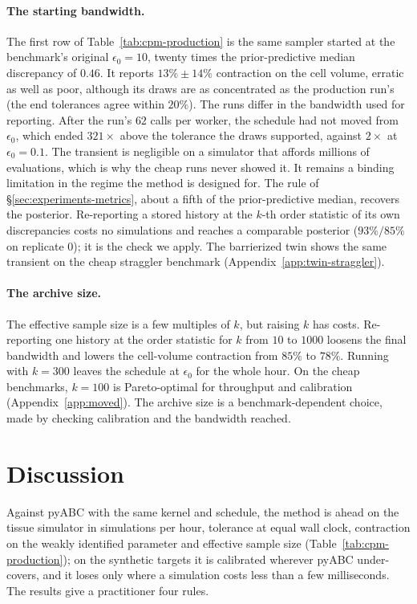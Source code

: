 \documentclass[10pt]{article}
\theoremstyle{plain}
\theoremstyle{definition}
\begin{document}
\paragraph{The starting bandwidth.} The first row of Table~\ref{tab:cpm-production} is the same sampler started at the benchmark's original $\epsilon_0=10$, twenty times the prior-predictive median discrepancy of $0.46$. It reports $13\%\pm14\%$ contraction on the cell volume, erratic as well as poor, although its draws are as concentrated as the production run's (the end tolerances agree within $20\%$). The runs differ in the bandwidth used for reporting. After the run's $62$ calls per worker, the schedule had not moved from $\epsilon_0$, which ended $321\times$ above the tolerance the draws supported, against $2\times$ at $\epsilon_0=0.1$. The transient is negligible on a simulator that affords millions of evaluations, which is why the cheap runs never showed it. It remains a binding limitation in the regime the method is designed for. The rule of \S\ref{sec:experiments-metrics}, about a fifth of the prior-predictive median, recovers the posterior. Re-reporting a stored history at the $k$-th order statistic of its own discrepancies costs no simulations and reaches a comparable posterior ($93\%/85\%$ on replicate $0$); it is the check we apply. The barrierized twin shows the same transient on the cheap straggler benchmark (Appendix~\ref{app:twin-straggler}).

\paragraph{The archive size.} The effective sample size is a few multiples of $k$, but raising $k$ has costs. Re-reporting one history at the order statistic for $k$ from $10$ to $1000$ loosens the final bandwidth and lowers the cell-volume contraction from $85\%$ to $78\%$. Running with $k=300$ leaves the schedule at $\epsilon_0$ for the whole hour. On the cheap benchmarks, $k=100$ is Pareto-optimal for throughput and calibration (Appendix~\ref{app:moved}). The archive size is a benchmark-dependent choice, made by checking calibration and the bandwidth reached.

\section{Discussion}\label{sec:discussion}
Against pyABC with the same kernel and schedule, the method is ahead on the tissue simulator in simulations per hour, tolerance at equal wall clock, contraction on the weakly identified parameter and effective sample size (Table~\ref{tab:cpm-production}); on the synthetic targets it is calibrated wherever pyABC under-covers, and it loses only where a simulation costs less than a few milliseconds. The results give a practitioner four rules.
\end{document}
